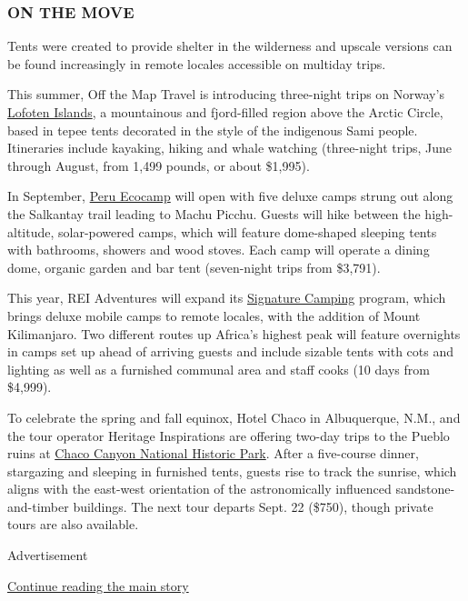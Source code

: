 \hypertarget{on-the-move}{%
\subsubsection{ON THE MOVE}\label{on-the-move}}

Tents were created to provide shelter in the wilderness and upscale
versions can be found increasingly in remote locales accessible on
multiday trips.

This summer, Off the Map Travel is introducing three-night trips on
Norway's
\href{https://www.offthemap.travel/experiences/glamping-in-lofoten-islands/}{Lofoten
Islands}, a mountainous and fjord-filled region above the Arctic Circle,
based in tepee tents decorated in the style of the indigenous Sami
people. Itineraries include kayaking, hiking and whale watching
(three-night trips, June through August, from 1,499 pounds, or about
\$1,995).

In September, \href{https://www.peruecocamp.com/}{Peru Ecocamp} will
open with five deluxe camps strung out along the Salkantay trail leading
to Machu Picchu. Guests will hike between the high-altitude,
solar-powered camps, which will feature dome-shaped sleeping tents with
bathrooms, showers and wood stoves. Each camp will operate a dining
dome, organic garden and bar tent (seven-night trips from \$3,791).

This year, REI Adventures will expand its
\href{https://www.rei.com/adventures/trips/signature-camping}{Signature
Camping} program, which brings deluxe mobile camps to remote locales,
with the addition of Mount Kilimanjaro. Two different routes up Africa's
highest peak will feature overnights in camps set up ahead of arriving
guests and include sizable tents with cots and lighting as well as a
furnished communal area and staff cooks (10 days from \$4,999).

To celebrate the spring and fall equinox, Hotel Chaco in Albuquerque,
N.M., and the tour operator Heritage Inspirations are offering two-day
trips to the Pueblo ruins at
\href{https://www.heritageinspirations.com/chaco-tours/chaco-canyon-glamping-overnight/}{Chaco
Canyon National Historic Park}. After a five-course dinner, stargazing
and sleeping in furnished tents, guests rise to track the sunrise, which
aligns with the east-west orientation of the astronomically influenced
sandstone-and-timber buildings. The next tour departs Sept. 22 (\$750),
though private tours are also available.

Advertisement

\protect\hyperlink{after-bottom}{Continue reading the main story}

